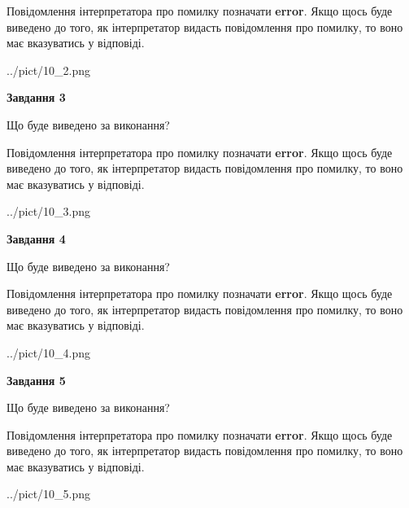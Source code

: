 \documentclass[12pt, ukrainian]{article}
\begin{document}
{\begin {large}
Повідомлення інтерпретатора про помилку позначати \textbf{error}.
Якщо щось буде виведено до того, як інтерпретатор видасть повідомлення про помилку, 
то воно має вказуватись у відповіді. \par


\begin{center}
	{../pict/10_2.png}
\end{center}
\newpage

{\begin {center}\textbf{Завдання 3}\end {center}}\par
Що буде виведено за виконання?

Повідомлення інтерпретатора про помилку позначати \textbf{error}.
Якщо щось буде виведено до того, як інтерпретатор видасть повідомлення про помилку, 
то воно має вказуватись у відповіді. \par


\begin{center}
	{../pict/10_3.png}
\end{center}
\newpage

{\begin {center}\textbf{Завдання 4}\end {center}}\par
Що буде виведено за виконання?

Повідомлення інтерпретатора про помилку позначати \textbf{error}.
Якщо щось буде виведено до того, як інтерпретатор видасть повідомлення про помилку, 
то воно має вказуватись у відповіді. \par


\begin{center}
	{../pict/10_4.png}
\end{center}
\newpage

{\begin {center}\textbf{Завдання 5}\end {center}}\par
Що буде виведено за виконання?

Повідомлення інтерпретатора про помилку позначати \textbf{error}.
Якщо щось буде виведено до того, як інтерпретатор видасть повідомлення про помилку, 
то воно має вказуватись у відповіді. \par


\begin{center}
	{../pict/10_5.png}
\end{center}
\newpage


\end{large}}
\end{document}
